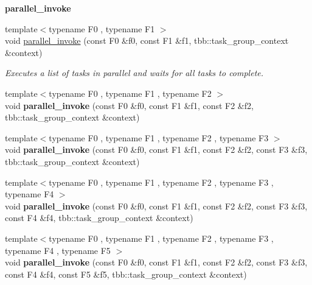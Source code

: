 \begin{Indent}{\bf parallel\+\_\+invoke}\par
\begin{DoxyCompactItemize}
\item 
{\footnotesize template$<$typename F0 , typename F1 $>$ }\\void \hyperlink{group__algorithms_ga14459dcbcd631194df803b155a7f610b}{parallel\+\_\+invoke} (const F0 \&f0, const F1 \&f1, tbb\+::task\+\_\+group\+\_\+context \&context)
\begin{DoxyCompactList}\small\item\em Executes a list of tasks in parallel and waits for all tasks to complete. \end{DoxyCompactList}\item 
\hypertarget{group__algorithms_gaaea3f3a8883128afb596a963e856277f}{}{\footnotesize template$<$typename F0 , typename F1 , typename F2 $>$ }\\void {\bfseries parallel\+\_\+invoke} (const F0 \&f0, const F1 \&f1, const F2 \&f2, tbb\+::task\+\_\+group\+\_\+context \&context)\label{group__algorithms_gaaea3f3a8883128afb596a963e856277f}

\item 
\hypertarget{group__algorithms_ga74932e64ede5047387108fa45f1af96f}{}{\footnotesize template$<$typename F0 , typename F1 , typename F2 , typename F3 $>$ }\\void {\bfseries parallel\+\_\+invoke} (const F0 \&f0, const F1 \&f1, const F2 \&f2, const F3 \&f3, tbb\+::task\+\_\+group\+\_\+context \&context)\label{group__algorithms_ga74932e64ede5047387108fa45f1af96f}

\item 
\hypertarget{group__algorithms_gaefc1ba8f73cbdd094575f6db454fc6b5}{}{\footnotesize template$<$typename F0 , typename F1 , typename F2 , typename F3 , typename F4 $>$ }\\void {\bfseries parallel\+\_\+invoke} (const F0 \&f0, const F1 \&f1, const F2 \&f2, const F3 \&f3, const F4 \&f4, tbb\+::task\+\_\+group\+\_\+context \&context)\label{group__algorithms_gaefc1ba8f73cbdd094575f6db454fc6b5}

\item 
\hypertarget{group__algorithms_ga3f02dfbb94238b2cf2ef8f20844b03af}{}{\footnotesize template$<$typename F0 , typename F1 , typename F2 , typename F3 , typename F4 , typename F5 $>$ }\\void {\bfseries parallel\+\_\+invoke} (const F0 \&f0, const F1 \&f1, const F2 \&f2, const F3 \&f3, const F4 \&f4, const F5 \&f5, tbb\+::task\+\_\+group\+\_\+context \&context)\label{group__algorithms_ga3f02dfbb94238b2cf2ef8f20844b03af}


\end{DoxyCompactItemize}
\end{Indent}
